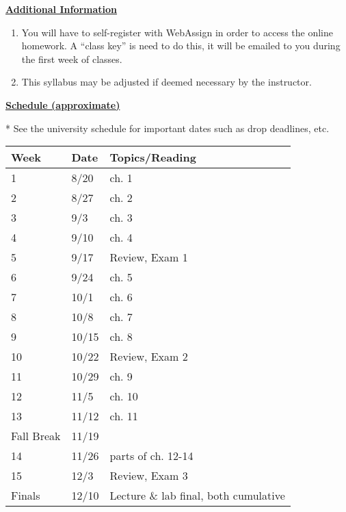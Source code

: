 \documentclass[12pt]{article}
\begin{document}
\underline{\textbf{Additional Information}} \par
\begin{enumerate}
\item You will have to self-register with WebAssign in order to access the online homework.
A “class key” is need to do this, it will be emailed to you during the first week of classes.
\item This syllabus may be adjusted if deemed necessary by the instructor.
\end{enumerate}

\pagebreak

\underline{\textbf{Schedule (approximate)}} \par
* See the university schedule for important dates such as drop deadlines, etc.
\begin{longtable}{| p{} | p{} | p{} |}
\hline
Week & Date & Topics/Reading \\ \hline
1 & 8/20 & ch. 1 \\ \hline
2 & 8/27 & ch. 2 \\ \hline
3 & 9/3 & ch. 3 \\ \hline
4 & 9/10 & ch. 4 \\ \hline
5 & 9/17 & Review, Exam 1 \\ \hline
6 & 9/24 & ch. 5 \\ \hline
7 & 10/1 & ch. 6 \\ \hline
8 & 10/8 & ch. 7 \\ \hline
9 & 10/15 & ch. 8 \\ \hline
10 & 10/22 & Review, Exam 2 \\ \hline
11 & 10/29 & ch. 9 \\ \hline
12 & 11/5 & ch. 10 \\ \hline
13 & 11/12 & ch. 11 \\ \hline
Fall Break & 11/19 &   \\ \hline
14 & 11/26 & parts of ch. 12-14 \\ \hline
15 & 12/3 & Review, Exam 3 \\ \hline
Finals & 12/10 & Lecture \& lab final, both cumulative \\ \hline

\end{longtable}
\end{document}
